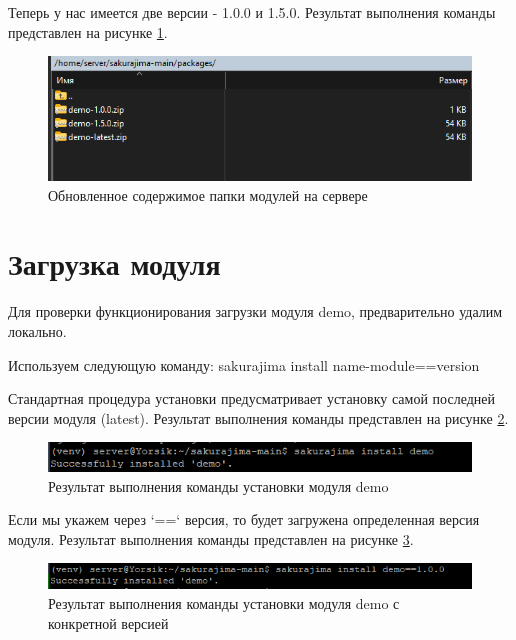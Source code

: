 \newpage

Теперь у нас имеется две версии - 1.0.0 и 1.5.0. Результат выполнения команды представлен на рисунке \ref{fig:test5}.

\begin{figure}
  \centering
  \includegraphics[width=.8\textwidth]{graphics/test/demo_jwt_final.png}
  \caption{Обновленное содержимое папки модулей на сервере}
  \label{fig:test5}
\end{figure}

\section{Загрузка модуля}

Для проверки функционирования загрузки модуля demo, предварительно удалим локально.

Используем следующую команду: sakurajima install name-module==version

Стандартная процедура установки предусматривает установку самой последней версии модуля (latest). Результат выполнения команды представлен на рисунке \ref{fig:test6}.

\begin{figure}
  \centering
  \includegraphics[width=.8\textwidth]{graphics/test/dev_install.png}
  \caption{Результат выполнения команды установки модуля demo}
  \label{fig:test6}
\end{figure}

Если мы укажем через `==` версия, то будет загружена определенная версия модуля. Результат выполнения команды представлен на рисунке \ref{fig:test7}.

\begin{figure}
  \centering
  \includegraphics[width=.8\textwidth]{graphics/test/dev_install_ver.png}
  \caption{Результат выполнения команды установки модуля demo с конкретной версией}
  \label{fig:test7}
\end{figure}

